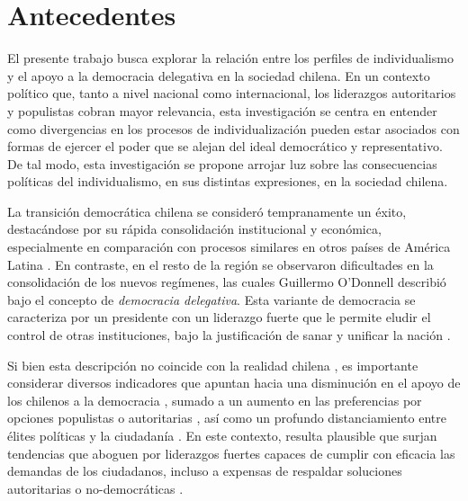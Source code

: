 \documentclass[12pt,twoside]{templates/facsothesis}
\begin{document}
  \listoftables
  \thispagestyle{empty}

  \listoffigures
  \thispagestyle{empty}


\mainmatter %
\titleformat{\chapter}{\normalfont\Huge\bfseries}{\thechapter}{1em}{}
\pagestyle{fancyplain} %

\hypertarget{antecedentes}{%
\chapter{Antecedentes}\label{antecedentes}}

El presente trabajo busca explorar la relación entre los perfiles de individualismo y el apoyo a la democracia delegativa en la sociedad chilena. En un contexto político que, tanto a nivel nacional como internacional, los liderazgos autoritarios y populistas cobran mayor relevancia, esta investigación se centra en entender como divergencias en los procesos de individualización pueden estar asociados con formas de ejercer el poder que se alejan del ideal democrático y representativo. De tal modo, esta investigación se propone arrojar luz sobre las consecuencias políticas del individualismo, en sus distintas expresiones, en la sociedad chilena.

La transición democrática chilena se consideró tempranamente un éxito, destacándose por su rápida consolidación institucional y económica, especialmente en comparación con procesos similares en otros países de América Latina \citep{odonnell1994}. En contraste, en el resto de la región se observaron dificultades en la consolidación de los nuevos regímenes, las cuales Guillermo O'Donnell \citeyearpar{odonnell1994} describió bajo el concepto de \emph{democracia delegativa}. Esta variante de democracia se caracteriza por un presidente con un liderazgo fuerte que le permite eludir el control de otras instituciones, bajo la justificación de sanar y unificar la nación \citep{odonnell1994}.

Si bien esta descripción no coincide con la realidad chilena \citep{odonnell1994}, es importante considerar diversos indicadores que apuntan hacia una disminución en el apoyo de los chilenos a la democracia \citep{cep}, sumado a un aumento en las preferencias por opciones populistas o autoritarias \citep{cadem2023, cerc-mori, diaz2023}, así como un profundo distanciamiento entre élites políticas y la ciudadanía \citep{luna2016}. En este contexto, resulta plausible que surjan tendencias que aboguen por liderazgos fuertes capaces de cumplir con eficacia las demandas de los ciudadanos, incluso a expensas de respaldar soluciones autoritarias o no-democráticas \citep{carlin2018}.
\end{document}
